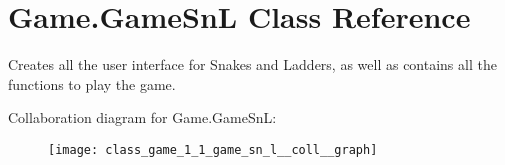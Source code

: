 \hypertarget{class_game_1_1_game_sn_l}{}\section{Game.\+Game\+Sn\+L Class Reference}
\label{class_game_1_1_game_sn_l}


Creates all the user interface for Snakes and Ladders, as well as contains all the functions to play the game.  




Collaboration diagram for Game.\+Game\+Sn\+L\+:
\nopagebreak
\begin{figure}[H]
\begin{center}
\leavevmode
\texttt{[image: class\_game\_1\_1\_game\_sn\_l\_\_coll\_\_graph]}
\end{center}
\end{figure}
